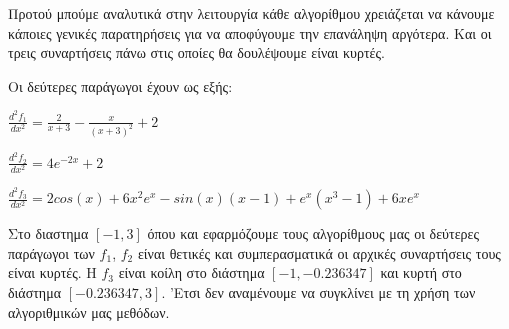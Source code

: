 Προτού μπούμε αναλυτικά στην λειτουργία κάθε αλγορίθμου χρειάζεται να κάνουμε κάποιες γενικές
παρατηρήσεις για να αποφύγουμε την επανάληψη αργότερα. Και οι τρεις συναρτήσεις πάνω στις οποίες
θα δουλέψουμε είναι κυρτές. 

Οι δεύτερες παράγωγοι έχουν ως εξής:

$\frac{d^2f_1}{dx^2} = \frac{2}{x + 3} - \frac{x}{(x + 3)^2} + 2$

$\frac{d^2f_2}{dx^2} = 4e^{-2x} + 2$

$\frac{d^2f_3}{dx^2} = 2cos(x) + 6x^2e^{x} - sin(x)(x - 1) + e^{x}(x^3 - 1) + 6xe^{x}$

Στο διαστημα $[-1,3]$ όπου και εφαρμόζουμε τους αλγορίθμους μας οι δεύτερες παράγωγοι των $f_1$, $f_2$ είναι
θετικές και συμπερασματικά οι αρχικές συναρτήσεις τους είναι κυρτές. Η $f_3$ είναι κοίλη στο διάστημα
$[-1,-0.236347]$ και κυρτή στο διάστημα $[-0.236347,3]$. 'Ετσι δεν αναμένουμε να συγκλίνει με τη χρήση 
των αλγοριθμικών μας μεθόδων.

